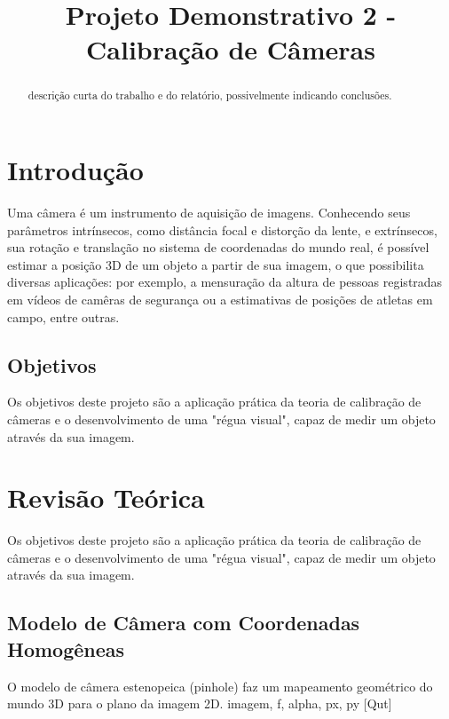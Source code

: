\documentclass[conference]{IEEEtran}
\begin{document}
\title{Projeto Demonstrativo 2 - Calibração de Câmeras}

\author{
}

\maketitle

\begin{abstract}
descrição curta do trabalho e do relatório, possivelmente indicando conclusões.
\end{abstract}


\section{Introdução}
Uma câmera é um instrumento de aquisição de imagens. Conhecendo seus parâmetros intrínsecos, como distância focal e distorção da lente, e extrínsecos, sua rotação e translação no sistema de coordenadas do mundo real, é possível estimar a posição 3D de um objeto a partir de sua imagem\cite{tese}, o que possibilita diversas aplicações: por exemplo, a mensuração da altura de pessoas registradas em vídeos de camêras de segurança ou a estimativas de posições de atletas em campo, entre outras.

\subsection{Objetivos}
Os objetivos deste projeto são a aplicação prática da teoria de calibração de câmeras e o desenvolvimento de uma "régua visual", capaz de medir um objeto através da sua imagem.

\section{Revisão Teórica}
Os objetivos deste projeto são a aplicação prática da teoria de calibração de câmeras e o desenvolvimento de uma "régua visual", capaz de medir um objeto através da sua imagem.

\subsection{Modelo de Câmera com Coordenadas Homogêneas}
O modelo de câmera estenopeica (pinhole) faz um mapeamento geométrico do mundo 3D para o plano da imagem 2D.\cite{unicamp}
imagem, f, alpha, px, py [Qut]
\end{document}
